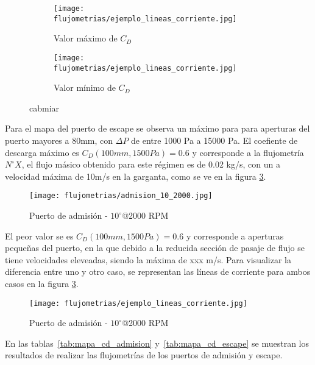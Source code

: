 \begin{figure}
    \centering
    \begin{subfigure}{0.4\textwidth}
        \centering
        \texttt{[image: flujometrias/ejemplo\_lineas\_corriente.jpg]}
        \caption{Valor máximo de $C_{D}$}
    \end{subfigure}
    \hfill
    \begin{subfigure}{0.4\textwidth}
        \centering
        \texttt{[image: flujometrias/ejemplo\_lineas\_corriente.jpg]}
        \caption{Valor mínimo de $C_{D}$}
    \end{subfigure}
    \caption{cabmiar}\label{fig:comparativa_lineas_corriente}
\end{figure}

Para el mapa del puerto de escape se observa un máximo para para aperturas del
puerto mayores a 80mm, con $\Delta P$ de entre 1000 Pa a 15000 Pa.
%
El coefiente de descarga máximo es $C_{D}(100mm, 1500Pa) = 0.6$ y corresponde a
la flujometría $N^{\circ} X$, el flujo másico obtenido para este régimen es de
0.02 kg/s, con un a velocidad máxima de 10m/s en la garganta, como se ve en la
figura \ref{fig:admision_10_2000.jpg}.

\begin{figure}
    \centering
    \texttt{[image: flujometrias/admision\_10\_2000.jpg]}
    \caption{Puerto de admisión - $10^{\circ}$@2000 RPM}\label{fig:admision_10_2000.jpg}
\end{figure}

El peor valor se es $C_{D}(100mm, 1500Pa) = 0.6$ y corresponde a aperturas
pequeñas del puerto, en la que debido a la reducida sección de pasaje de flujo
se tiene velocidades eleveadas, siendo la máxima de xxx m/s.
%
Para visualizar la diferencia entre uno y otro caso, se representan las líneas
de corriente para ambos casos en la figura \ref{fig:admision_10_2000.jpg}.

\begin{figure}
    \centering
    \texttt{[image: flujometrias/ejemplo\_lineas\_corriente.jpg]}
    \caption{Puerto de admisión - $10^{\circ}$@2000 RPM}\label{fig:admision_10_2000.jpg}
\end{figure}

En las tablas~\ref{tab:mapa_cd_admision} y~\ref{tab:mapa_cd_escape} se muestran los
resultados de realizar las flujometrías de los puertos de admisión y escape.

